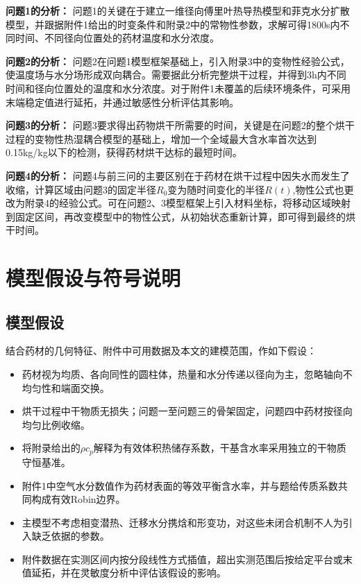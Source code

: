 \documentclass[withoutpreface,bwprint]{cumcmthesis}
\begin{document}
\textbf{问题1的分析：}  
问题1的关键在于建立一维径向傅里叶热导热模型和菲克水分扩散模型，并跟据附件1给出的时变条件和附录2中的常物性参数，求解可得1800s内不同时间、不同径向位置处的药材温度和水分浓度。

\textbf{问题2的分析：}  
问题2在问题1模型框架基础上，引入附录3中的变物性经验公式，使温度场与水分场形成双向耦合。需要据此分析完整烘干过程，并得到3h内不同时间和径向位置处的温度和水分浓度。对于附件1未覆盖的后续环境条件，可采用末端稳定值进行延拓，并通过敏感性分析评估其影响。

\textbf{问题3的分析：}  
问题3要求得出药物烘干所需要的时间，关键是在问题2的整个烘干过程的变物性热湿耦合模型的基础上，增加一个全域最大含水率首次达到0.15kg/kg以下的检测，获得药材烘干达标的最短时间。

\textbf{问题4的分析：} 
问题4与前三问的主要区别在于药材在烘干过程中因失水而发生了收缩，计算区域由问题3的固定半径$R_0$变为随时间变化的半径$R(t)$,物性公式也更改为附录4的经验公式。可在问题2、3模型框架上引入材料坐标，将移动区域映射到固定区间，再改变模型中的物性公式，从初始状态重新计算，即可得到最终的烘干时间。


\section{模型假设与符号说明}
\subsection{模型假设}
结合药材的几何特征、附件中可用数据及本文的建模范围，作如下假设：

\begin{itemize}[itemindent=2em]
\item 药材视为均质、各向同性的圆柱体，热量和水分传递以径向为主，忽略轴向不均匀性和端面交换。
\item 烘干过程中干物质无损失；问题一至问题三的骨架固定，问题四中药材按径向均匀比例收缩。
\item 将附录给出的$\rho c_p$解释为有效体积热储存系数，干基含水率采用独立的干物质守恒基准。
\item 附件1中空气水分数值作为药材表面的等效平衡含水率，并与题给传质系数共同构成有效Robin边界。
\item 主模型不考虑相变潜热、迁移水分携焓和形变功，对这些未闭合机制不人为引入缺乏依据的参数。
\item 附件数据在实测区间内按分段线性方式插值，超出实测范围后按给定平台或末值延拓，并在灵敏度分析中评估该假设的影响。
\end{itemize}
\end{document}
